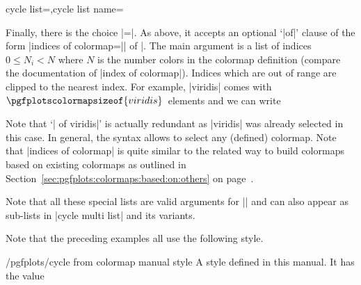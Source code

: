 \begin{pgfplotskeylist}{cycle list=,cycle list name=}
{Finally, there is the choice |=|. As above, it accepts an optional `|of|' clause of the form |indices of colormap=|| of |. The main argument is a list of indices $0\le N_i < N$ where $N$ is the number colors in the colormap definition (compare the documentation of |index of colormap|). Indices which are out of range are clipped to the nearest index. For example, |viridis| comes with $\pgfplotscolormapsizeof{viridis}$~elements and we can write
\begin{codeexample}[]
\end{codeexample}
Note that `| of viridis|' is actually redundant as |viridis| was already selected in this case. In general, the syntax allows to select any (defined) colormap.  Note that |indices of colormap| is quite similar to the related way to build colormaps based on existing colormaps as outlined in Section~\ref{sec:pgfplots:colormaps:based:on:others} on page~\pageref{sec:pgfplots:colormaps:based:on:others}.

Note that all these special lists are valid arguments for |\pgfplotscreateplotcyclelist| and can also appear as sub-lists in |cycle multi list| and its variants.

Note that the preceding examples all use the following style.
\begin{stylekey}{/pgfplots/cycle from colormap manual style}
	A style defined in this manual. It has the value
\begin{codeexample}
\end{codeexample}
\end{stylekey}

}
\end{pgfplotskeylist}
